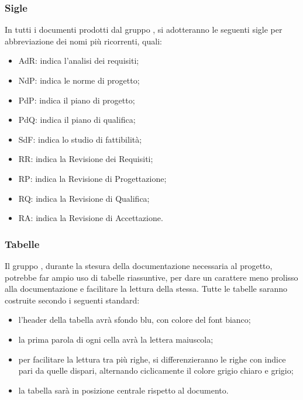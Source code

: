 \subsubsection{Sigle}
In tutti i documenti prodotti dal gruppo {\Gruppo}, si adotteranno le seguenti sigle per abbreviazione dei nomi più ricorrenti, quali:
\begin{itemize}
	\item AdR: indica l’analisi dei requisiti;
	\item NdP: indica le norme di progetto;
	\item PdP: indica il piano di progetto;
	\item PdQ: indica il piano di qualifica;
	\item SdF: indica lo studio di fattibilità;
	\item RR: indica la Revisione dei Requisiti;
	\item RP: indica la Revisione di Progettazione;
	\item RQ: indica la Revisione di Qualifica;
	\item RA: indica la Revisione di Accettazione.
\end{itemize}

\subsubsection{Tabelle}
Il gruppo {\Gruppo}, durante la stesura della documentazione necessaria al progetto, potrebbe far ampio uso di tabelle riassuntive, per dare un carattere meno prolisso alla documentazione e facilitare la lettura della stessa.
Tutte le tabelle saranno costruite secondo i seguenti standard:
\begin{itemize}
	\item l’header della tabella avrà sfondo blu, con colore del font bianco;
	\item la prima parola di ogni cella avrà la lettera maiuscola;
	\item per facilitare la lettura tra più righe, si differenzieranno le righe con indice pari da quelle dispari, alternando ciclicamente il colore grigio chiaro e grigio;
	\item la tabella sarà in posizione centrale rispetto al documento.
\end{itemize}

